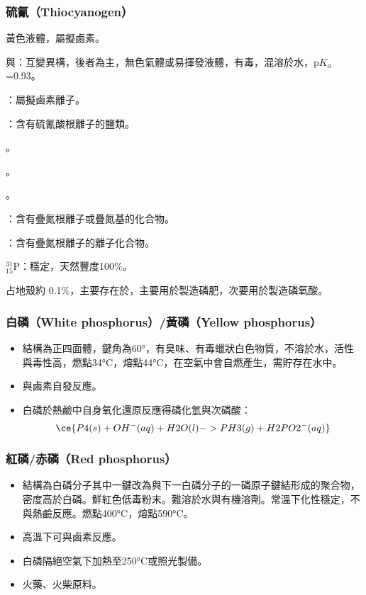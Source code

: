 \documentclass[a4paper,12pt]{report}
\begin{document}
\subsubsection{硫氰（Thiocyanogen）}
黃色液體，屬擬鹵素。
\bit
\item {}與：互變異構，後者為主，無色氣體或易揮發液體，有毒，混溶於水，p$K_a$=0.93。
\item {}：屬擬鹵素離子。
\item {}：含有硫氰酸根離子的鹽類。
\item {}。
\item {}。
\eit
{}
\bit
\item {}。
\item {}：含有疊氮根離子或疊氮基的化合物。
\item {}：含有疊氮根離子的離子化合物。
\eit
{}
\bit
\item $^{31}_{15}$P：穩定，天然豐度100\%。
\item 占地殼約 0.1\%，主要存在於，主要用於製造磷肥，次要用於製造磷氧酸。
\eit
\subsubsection{白磷（White phosphorus）/黃磷（Yellow phosphorus）}
\begin{itemize}
\item 結構為正四面體，鍵角為60°，有臭味、有毒蠟狀白色物質，不溶於水，活性與毒性高，燃點34°C，熔點44°C，在空氣中會自燃產生，需貯存在水中。
\item 與鹵素自發反應。
\item 白磷於熱鹼中自身氧化還原反應得磷化氫與次磷酸：
\[\ce{P4(s) + OH^-(aq) + H2O(l) -> PH3(g) + H2PO2^-(aq)}\]
\end{itemize}
\subsubsection{紅磷/赤磷（Red phosphorus）}
\begin{itemize}
\item 結構為白磷分子其中一鍵改為與下一白磷分子的一磷原子鍵結形成的聚合物，密度高於白磷。鮮紅色低毒粉末。難溶於水與有機溶劑。常溫下化性穩定，不與熱鹼反應。燃點400°C，熔點590°C。
\item 高溫下可與鹵素反應。
\item 白磷隔絕空氣下加熱至250°C或照光製備。
\item 火藥、火柴原料。
\end{itemize}
\end{document}
